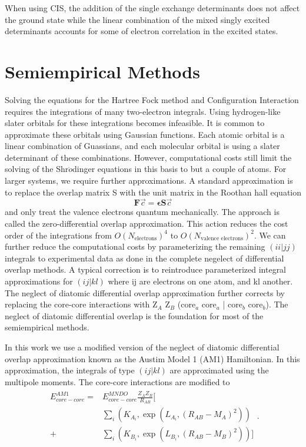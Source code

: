 When using CIS, the addition of the single exchange determinants does not affect the ground state
while the linear combination of the mixed singly excited determinants accounts for some of electron correlation in the excited states.

\section{Semiempirical Methods}
Solving the equations for the Hartree Fock method and Configuration Interaction requires the integrations of many two-electron integrals.
Using hydrogen-like slater orbitals for these integrations becomes infeasible.
It is common to approximate these orbitals using Gaussian functions.
Each atomic orbital is a linear combination of Guassians, and each molecular orbital is using a slater determinant of these combinations.
However, computational costs still limit the solving of the Shr\(\ddot{o}\)dinger equations in this basis to but a couple of atoms.
For larger systems, we require further approximations.
A standard approximation is to replace the overlap matrix S with the unit matrix in the Roothan hall equation
\begin{equation}
\mathbf{F} \vec{c} = \bm{\epsilon}\mathbf{S}\vec{c}
\end{equation}
and only treat the valence electrons quantum mechanically. \cite{christensen2016semiempirical}
The approach is called the zero-differential overlap approximation.
This action reduces the cost order of the integrations from \(O(N_{\text{electrons}})^4\) to \(O(N_{\text{valence electrons}})^2\).
We can further reduce the computational costs by parameterizing the remaining \((ii|jj)\) integrals to experimental data as done in the complete negelect of differential overlap methods.
A typical correction is to reintroduce parameterized integral approximations for \((ij|kl)\) where ij are electrons on one atom, and kl another. \cite{pople1965approximate}
The neglect of diatomic differential overlap approximation further corrects by replacing the core-core interactions with Z\(_A\) Z\(_B\) (core\(_a\) core\(_a\) | core\(_b\) core\(_b\)).
The neglect of diatomic differential overlap is the foundation for most of the semiempirical methods.

In this work we use a modified version of the neglect of diatomic differential overlap approximation known as the Austim Model 1 (AM1) Hamiltonian. \cite{Dewar1985}
In this approximation, the integrals of type \((ij | kl )\) are approximated using the multipole moments. \cite{Dewar1985}
The core-core interactions are modified to
\begin{align}
\begin{split}
E_{core-core}^{AM1} = &E_{core-core}^{MNDO} \frac{Z_{A} Z_{B}}{R_{AB}} [\\
  &\sum_i (K_{A_i}, \exp(L_{A_i}, (R_{AB} - M_A)^2)) \\
+ &\sum_i (K_{B_i}, \exp(L_{B_i}, (R_{AB} - M_B)^2))]
\end{split}.
\end{align}\cite{christensen2016semiempirical}

